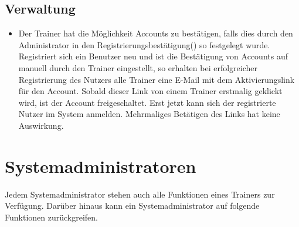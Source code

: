 \documentclass[a4paper]{scrreprt}
\newcounter{Lc}
\newcounter{Hc}
\newcommand{\stepHc}{\stepcounter{Hc}\setcounter{Lc}{0}}
\begin{document}
\subsection{Verwaltung}
\begin{itemize}
	\item {}
	Der Trainer hat die Möglichkeit Accounts zu bestätigen, falls dies durch den Administrator in den Registrierungsbestätigung() so festgelegt wurde. Registriert sich ein Benutzer neu und ist die Bestätigung von Accounts auf manuell durch den Trainer eingestellt, so erhalten bei erfolgreicher Registrierung des Nutzers alle Trainer eine E-Mail mit dem Aktivierungslink für den Account. Sobald dieser Link von einem Trainer erstmalig geklickt wird, ist der Account freigeschaltet. Erst jetzt kann sich der registrierte Nutzer im System anmelden. Mehrmaliges Betätigen des Links hat keine Auswirkung.
\end{itemize}


\section{Systemadministratoren}
Jedem Systemadministrator stehen auch alle Funktionen eines Trainers zur Verfügung. Darüber hinaus kann ein Systemadministrator auf folgende Funktionen zurückgreifen.
\stepHc
\end{document}
